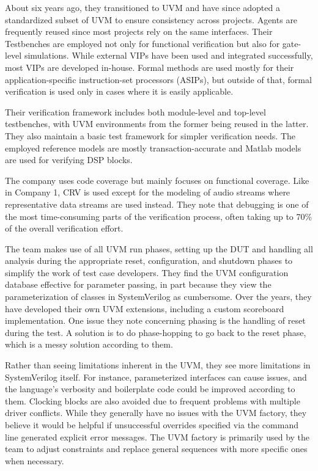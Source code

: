 About six years ago, they transitioned to UVM and have since adopted a standardized subset of UVM to ensure
consistency across projects. Agents are frequently reused since most projects rely on the same interfaces. Their
Testbenches are employed not only for functional verification but also for gate-level simulations. While external
VIPs have been used and integrated successfully, most VIPs are developed in-house. Formal methods are used mostly for
their application-specific instruction-set processors (ASIPs), but outside of that, formal verification is used
only in cases where it is easily applicable.

Their verification framework includes both module-level and top-level testbenches, with UVM environments from the
former being reused in the latter. They also maintain a basic test framework for simpler verification needs. The
employed reference models are mostly transaction-accurate and Matlab models are used for verifying DSP blocks.

The company uses code coverage but mainly focuses on functional coverage. Like in Company 1, CRV is used except for
the modeling of audio streams where representative data streams are used instead. They note that debugging is one of
the most time-consuming parts of the verification process, often taking up to 70\% of the overall verification effort.

The team makes use of all UVM run phases, setting up the DUT and handling all analysis during the appropriate reset,
configuration, and shutdown phases to simplify the work of test case developers. They find the UVM configuration database effective
for parameter passing, in part because they view the parameterization of classes in SystemVerilog as cumbersome. Over the
years, they have developed their own UVM extensions, including a custom scoreboard implementation. One issue they
note concerning phasing is the handling of reset during the test. A solution is to do phase-hopping to go back to the
reset phase, which is a messy solution according to them.

Rather than seeing limitations inherent in the UVM, they see more limitations in SystemVerilog itself. For instance,
parameterized interfaces can cause issues, and the language's verbosity and boilerplate code could be improved
according to them. Clocking blocks are also avoided due to frequent problems with multiple driver conflicts. While
they generally have no issues with the UVM factory, they believe it would be helpful if unsuccessful overrides
specified via the command line generated explicit error messages. The UVM factory is primarily used by the team to
adjust constraints and replace general sequences with more specific ones when necessary.

